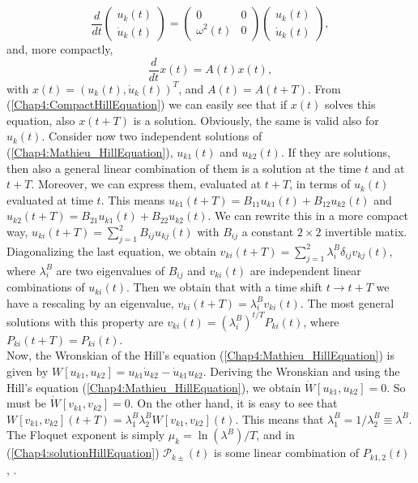 \documentclass[11pt,a4paper,twoside]{book}
\begin{document}
\begin{equation}
	\frac{d}{dt}
\left(
\begin{array}{c}
	u_{k}(t) \\
	\dot{u}_{k}(t)	
\end{array}
\right)
=
\left(
\begin{array}{cc}
	0  & 0 \\
	\omega^{2}(t) & 0
\end{array}
\right)
\left(
\begin{array}{c}
	u_{k}(t) \\
	\dot{u}_{k}(t)	
\end{array}
\right),
\end{equation}
and, more compactly,
\begin{equation}
	\label{Chap4:CompactHillEquation}
	\frac{d}{dt} x(t) = A(t) x(t),
\end{equation}
with $ x(t)=(u_{k}(t),\dot{u}_{k}(t))^{T} $, and $ A(t)=A(t+T) $. From (\ref{Chap4:CompactHillEquation}) we can easily see that if $ x(t) $ solves this equation, also $ x(t+T) $ is a solution. Obviously, the same is valid also for $ u_{k}(t) $. Consider now two independent solutions of (\ref{Chap4:Mathieu_HillEquation}), $ u_{k1}(t) $ and $ u_{k2}(t) $. If they are solutions, then also a general linear combination of them is a solution at the time $ t $ and at $ t+T $. Moreover, we can express them, evaluated at $ t+T $, in terms of $ u_{k}(t) $ evaluated at time $ t $. This means  $ u_{k1}(t+T)=B_{11}u_{k1}(t) + B_{12}u_{k2}(t) $ and $ u_{k2}(t+T)=B_{21}u_{k1}(t) + B_{22}u_{k2}(t) $. We can rewrite this in a more compact way, $ u_{ki}(t+T)= \sum_{j=1}^{2}B_{ij}u_{kj}(t) $ with $ B_{ij} $ a constant $ 2\times 2 $ invertible matix. Diagonalizing the last equation, we obtain $ v_{ki}(t+T)=\sum_{j=1}^{2}\lambda_{i}^{B}\delta_{ij}v_{kj}(t) $, where $ \lambda_{i}^{B} $ are two eigenvalues of $ B_{ij} $ and $ v_{ki}(t) $ are independent linear combinations of $ u_{ki}(t) $. Then we obtain that with a time shift $ t \rightarrow t+T $ we have a rescaling by an eigenvalue, $ v_{ki}(t+T)=\lambda_{i}^{B}v_{ki}(t) $. 
The most general solutions with this property are $ v_{ki}(t)=(\lambda_{i}^{B})^{t/T}P_{ki}(t) $, where $ P_{ki}(t+T)=P_{ki}(t) $. \\ Now, the Wronskian of the Hill's equation (\ref{Chap4:Mathieu_HillEquation}) is given by $ W[u_{k1},u_{k2}]=u_{k1}\dot{u}_{k2}-\dot{u}_{k1}u_{k2} $. Deriving the Wronskian and using the Hill's equation (\ref{Chap4:Mathieu_HillEquation}), we obtain $ \dot{W}[u_{k1},u_{k2}]=0 $. So must be $ \dot{W}[v_{k1},v_{k2}]=0$. On the other hand, it is easy to see that $ W[v_{k1},v_{k2}](t+T) = \lambda_{1}^{B}\lambda_{2}^{B}W[v_{k1},v_{k2}](t) $. This means that $ \lambda_{1}^{B}=1/\lambda^{B}_{2} \equiv \lambda^{B} $. The Floquet exponent is simply $ \mu_{k} = \ln(\lambda^{B})/T $, and in (\ref{Chap4:solutionHillEquation}) $\mathcal{P}_{k\pm}(t)$ is some linear combination of $ P_{k1,2}(t) $ \cite{Chap4:AminHetrzberg}, \cite{Chap4:Lozanov}.\\ 
\end{document}
